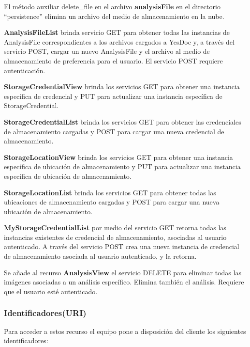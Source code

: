 \documentclass[a4paper,12pt]{article}
\begin{document}
El método auxiliar delete\_file en el archivo \textbf{analysisFile} en el directorio ``persistence'' elimina un archivo del medio de almacenamiento en la nube.

\textbf{AnalysisFileList} brinda servicio GET para obtener todas las instancias de AnalysisFile correspondientes a los archivos cargados a YesDoc y, a través del servicio POST, cargar un nuevo AnalysisFile y el archivo al medio de almacenamiento de preferencia para el usuario. El servicio POST requiere autenticación.

\textbf{StorageCredentialView} brinda los servicios GET para obtener una instancia específica de credencial y PUT para actualizar una instancia específica de StorageCredential.

\textbf{StorageCredentialList} brinda los servicios GET para obtener las credenciales de almacenamiento cargadas y POST para cargar una nueva credencial de almacenamiento.

\textbf{StorageLocationView} brinda los servicios GET para obtener una instancia específica de ubicación de almacenamiento y PUT para actualizar una instancia específica de ubicación de almacenamiento.	

\textbf{StorageLocationList} brinda los servicios GET para obtener todas las ubicaciones de almacenamiento cargadas y POST para cargar una nueva ubicación de almacenamiento.

\textbf{MyStorageCredentialList} por medio del servicio GET retorna todas las instancias existentes de credencial de almacenamiento, asociadas al usuario autenticado. A través del servicio POST crea una nueva instancia de credencial de almacenamiento asociada al usuario autenticado, y la retorna.

Se añade al recurso \textbf{AnalysisView} el servicio DELETE para eliminar todas las imágenes asociadas a un análisis específico. Elimina también el análisis. Requiere que el usuario esté autenticado.

\subsubsection{Identificadores(URI)}
Para acceder a estos recurso el equipo pone a disposición del cliente los siguientes identificadores:
\end{document}
